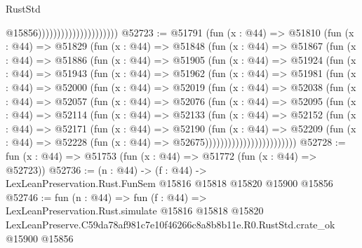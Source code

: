 \begin{lexlean}{RustStd}
\begin{coremodule}
                                              @15856)))))))))))))))))))))
@52723 := @51791
    (fun (x : @44) =>
    @51810
      (fun (x : @44) =>
      @51829
        (fun (x : @44) =>
        @51848
          (fun (x : @44) =>
          @51867
            (fun (x : @44) =>
            @51886
              (fun (x : @44) =>
              @51905
                (fun (x : @44) =>
                @51924
                  (fun (x : @44) =>
                  @51943
                    (fun (x : @44) =>
                    @51962
                      (fun (x : @44) =>
                      @51981
                        (fun (x : @44) =>
                        @52000
                          (fun (x : @44) =>
                          @52019
                            (fun (x : @44) =>
                            @52038
                              (fun (x : @44) =>
                              @52057
                                (fun (x : @44) =>
                                @52076
                                  (fun (x : @44) =>
                                  @52095
                                    (fun (x : @44) =>
                                    @52114
                                      (fun (x : @44) =>
                                      @52133
                                        (fun (x : @44) =>
                                        @52152
                                          (fun (x : @44) =>
                                          @52171
                                            (fun (x : @44) =>
                                            @52190
                                              (fun (x : @44) =>
                                              @52209
                                                (fun (x : @44) =>
                                                @52228
                                                  (fun (x : @44) => @52675))))))))))))))))))))))))
@52728 := fun (x : @44) => @51753 (fun (x : @44) => @51772 (fun (x : @44) => @52723))
@52736 := (n : @44) ->
  (f : @44) -> LexLeanPreservation.Rust.FunSem @15816 @15818 @15820 @15900 @15856
@52746 := fun (n : @44) =>
  fun (f : @44) =>
  LexLeanPreservation.Rust.simulate
    @15816
    @15818
    @15820
    LexLeanPreserve.C59da78af981c7e10f46266c8a8b8b11e.R0.RustStd.crate_ok
    @15900
    @15856
\end{coremodule}
\end{lexlean}
